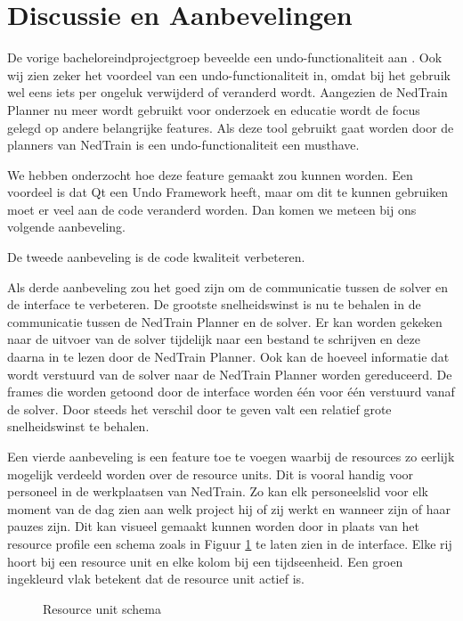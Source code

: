 \section{Discussie en Aanbevelingen}
De vorige bacheloreindprojectgroep beveelde een undo-functionaliteit aan \cite{bep2012nedtrain}. Ook wij zien zeker het voordeel van een undo-functionaliteit in, omdat bij het gebruik wel eens iets per ongeluk verwijderd of veranderd wordt. Aangezien de NedTrain Planner nu meer wordt gebruikt voor onderzoek en educatie wordt de focus gelegd op andere belangrijke features. Als deze tool gebruikt gaat worden door de planners van NedTrain is een undo-functionaliteit een musthave. 

We hebben onderzocht hoe deze feature gemaakt zou kunnen worden. Een voordeel is dat Qt een Undo Framework heeft, maar om dit te kunnen gebruiken moet er veel aan de code veranderd worden. Dan komen we meteen bij ons volgende aanbeveling.

De tweede aanbeveling is de code kwaliteit verbeteren. 

Als derde aanbeveling zou het goed zijn om de communicatie tussen de solver en de interface te verbeteren. De grootste snelheidswinst is nu te behalen in de communicatie tussen de NedTrain Planner en de solver. Er kan worden gekeken naar de uitvoer van de solver tijdelijk naar een bestand te schrijven en deze daarna in te lezen door de NedTrain Planner. Ook kan de hoeveel informatie dat wordt verstuurd van de solver naar de NedTrain Planner worden gereduceerd. De frames die worden getoond door de interface worden \'e\'en voor \'e\'en verstuurd vanaf de solver. Door steeds het verschil door te geven valt een relatief grote snelheidswinst te behalen.

Een vierde aanbeveling is een feature toe te voegen waarbij de resources zo eerlijk mogelijk verdeeld worden over de resource units. Dit is vooral handig voor personeel in de werkplaatsen van NedTrain. Zo kan elk personeelslid voor elk moment van de dag zien aan welk project hij of zij werkt en wanneer zijn of haar pauzes zijn. Dit kan visueel gemaakt kunnen worden door in plaats van het resource profile een schema zoals in Figuur \ref{fig:schema} te laten zien in de interface. Elke rij hoort bij een resource unit en elke kolom bij een tijdseenheid. Een groen ingekleurd vlak betekent dat de resource unit actief is.

\begin{figure}[H]
\centering

\caption{Resource unit schema}
\label{fig:schema}
\end{figure}
